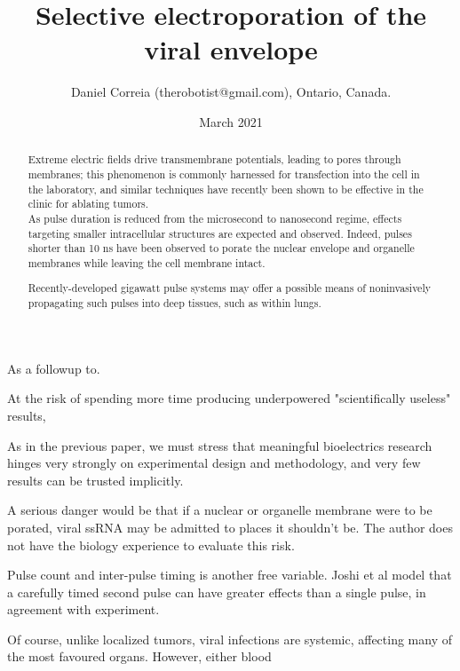 \documentclass[fleqn,10pt]{article}
\begin{document}
\title{Selective electroporation of the viral envelope}
\author{\small{Daniel Correia (therobotist@gmail.com), Ontario, Canada.}}
\date{March 2021}

\flushbottom 
\maketitle
\thispagestyle{empty}

\renewcommand{\abstractname}{Summary}    %



\begin{abstract}
	\noindent Extreme electric fields drive transmembrane potentials, leading to pores through membranes; this phenomenon is commonly harnessed for transfection into the cell in the laboratory, and similar techniques have recently been shown to be effective in the clinic for ablating tumors.\\
	
	\noindent As pulse duration is reduced from the microsecond to nanosecond regime, effects targeting smaller intracellular structures are expected and observed. Indeed, pulses shorter than 10 ns have been observed to porate the nuclear envelope and organelle membranes while leaving the cell membrane intact. 
	
	Recently-developed gigawatt pulse systems may offer a possible means of noninvasively propagating such pulses into deep tissues, such as within lungs. 
\end{abstract}

As a followup to. 

At the risk of spending more time producing underpowered "scientifically useless" results, 

As in the previous paper, we must stress that meaningful bioelectrics research hinges very strongly on experimental design and methodology, and very few results can be trusted implicitly.


A serious danger would be that if a nuclear or organelle membrane were to be porated, viral ssRNA may be admitted to places it shouldn't be. The author does not have the biology experience to evaluate this risk.

Pulse count and inter-pulse timing is another free variable. Joshi et al \cite{Selfconsistent2001} model that a carefully timed second pulse can have greater effects than a single pulse, in agreement with experiment.

Of course, unlike localized tumors, viral infections are systemic, affecting many of the most favoured organs. However, either blood 
\end{document}
